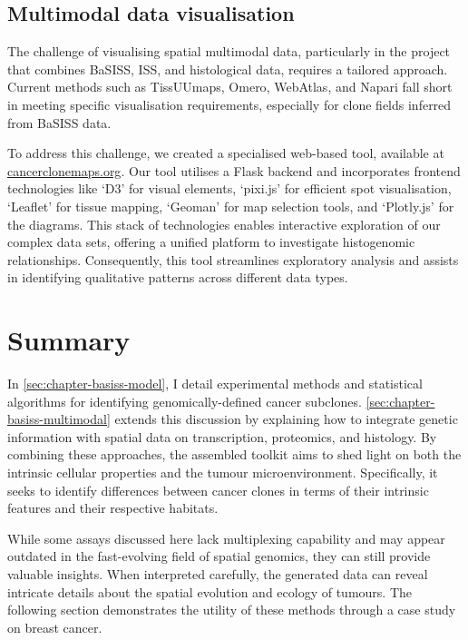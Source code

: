
\subsection{Multimodal data visualisation}
\label{sec:modalities-cancerclonemaps}

The challenge of visualising spatial multimodal data, particularly in the project that combines \ac{BaSISS}, \ac{ISS}, and histological data, requires a tailored approach. Current methods such as \ac{TissUUmaps}, \ac{Omero}, \ac{WebAtlas}, and \ac{Napari} fall short in meeting specific visualisation requirements, especially for clone fields inferred from \ac{BaSISS} data.

To address this challenge, we created a specialised web-based tool, available at \href{https://www.cancerclonemaps.org/}{cancerclonemaps.org}. Our tool utilises a Flask backend and incorporates frontend technologies like `D3' for visual elements, `pixi.js' for efficient spot visualisation, `Leaflet' for tissue mapping, `Geoman' for map selection tools, and `Plotly.js' for the diagrams. This stack of technologies enables interactive exploration of our complex data sets, offering a unified platform to investigate histogenomic relationships. Consequently, this tool streamlines exploratory analysis and assists in identifying qualitative patterns across different data types.

\section{Summary}
\label{sec:modalities-summary}

In \cref{sec:chapter-basiss-model}, I detail experimental methods and statistical algorithms for identifying genomically-defined cancer subclones. \cref{sec:chapter-basiss-multimodal} extends this discussion by explaining how to integrate genetic information with spatial data on transcription, proteomics, and histology. By combining these approaches, the assembled toolkit aims to shed light on both the intrinsic cellular properties and the tumour microenvironment. Specifically, it seeks to identify differences between cancer clones in terms of their intrinsic features and their respective habitats.

While some assays discussed here lack multiplexing capability and may appear outdated in the fast-evolving field of spatial genomics, they can still provide valuable insights. When interpreted carefully, the generated data can reveal intricate details about the spatial evolution and ecology of tumours. The following section  demonstrates the utility of these methods through a case study on breast cancer.